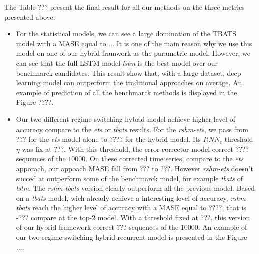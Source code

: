 \documentclass{article} %
\newcommand{\numberts}{10000}
\newcommand{\threshold}{\eta}
\newcommand{\classifier}{RNN_c}
\begin{document}
The Table ??? present the final result for all our methods on the three metrics presented above.
\begin{itemize}
	\item For the statistical models, we can see a large domination of the TBATS model with a MASE equal to ... It is one of the main reason why we use this model on one of our hybrid framwork as the parametric model. However, we can see that the full LSTM model \textit{lstm} is the best model over our benchmarck candidates. This result show that, with a large dataset, deep learning model can outperform the traditional approaches on average. An example of prediction of all the benchmarck methods is displayed in the Figure ????.
	\item Our two different regime switching hybrid model achieve higher level of accuracy compare to the \textit{ets} or \textit{tbats} results. For the \textit{rshm-ets}, we pass from ??? for the \textit{ets} model alone to ???? for the hybrid model. Its $\classifier$ threshold $\threshold$ was fix at ???. With this threshold, the error-corrector model correct ???? sequences of the $\numberts$. On these corrected time series, compare to the \textit{ets} apporach, our appoach MASE fall from ??? to ???. However \textit{rshm-ets} doesn't succed at outperform some of the benchmarck model, for example \textit{tbats} of \textit{lstm}. The \textit{rshm-tbats} version clearly outperform all the previous model. Based on a \textit{tbats} model, wich already achieve a interesting level of accuracy, \textit{rshm-tbats} reach the higher level of accuracy with a MASE equal to ????, that is -??? compare at the top-2 model. With a threshold fixed at ???, this version of our hybrid framework correct ??? sequences of the $\numberts$. An example of our two regime-switching hybrid recurrent model is presented in the Figure ....
\end{itemize}
\end{document}
